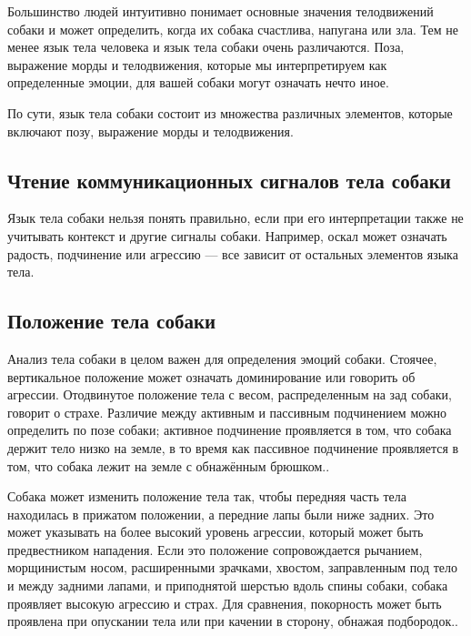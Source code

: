 
Большинство людей интуитивно понимает основные значения телодвижений собаки и может определить, когда их собака счастлива, напугана или зла. Тем не менее язык тела человека и язык тела собаки очень различаются. Поза, выражение морды и телодвижения, которые мы интерпретируем как определенные эмоции, для вашей собаки могут означать нечто иное. 

По сути, язык тела собаки состоит из множества различных элементов, которые включают позу, выражение морды и телодвижения.

\subsection{Чтение коммуникационных сигналов тела собаки}

Язык тела собаки нельзя понять правильно, если при его интерпретации также не учитывать контекст и другие сигналы собаки. Например, оскал может означать радость, подчинение или агрессию — все зависит от остальных элементов языка тела.

\subsection{Положение тела собаки}

Анализ тела собаки в целом важен для определения эмоций собаки. Стоячее, вертикальное положение может означать доминирование или говорить об агрессии. Отодвинутое положение тела с весом, распределенным на зад собаки, говорит о страхе.\cite{Simpson1997}\cite{interpretation} Различие между активным и пассивным подчинением можно определить по позе собаки; активное подчинение проявляется в том, что собака держит тело низко на земле, в то время как пассивное подчинение проявляется в том, что собака лежит на земле с обнажённым брюшком.\cite{The_Domestic_Dog}.

Собака может изменить положение тела так, чтобы передняя часть тела находилась в прижатом положении, а передние лапы были ниже задних. Это может указывать на более высокий уровень агрессии, который может быть предвестником нападения. Если это положение сопровождается рычанием, морщинистым носом, расширенными зрачками, хвостом, заправленным под тело и между задними лапами, и приподнятой шерстью вдоль спины собаки, собака проявляет высокую агрессию и страх.\cite{speak_dog} Для сравнения, покорность может быть проявлена при опускании тела или при качении в сторону, обнажая подбородок.\cite{speak_dog}.


